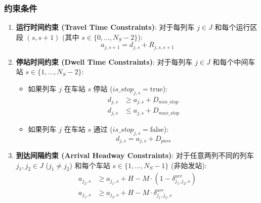 \documentclass{article}
\begin{document}
\subsubsection{约束条件}
\begin{enumerate}
    \item \textbf{运行时间约束 (Travel Time Constraints)}: 对于每列车 $j \in J$
        和每个运行区段 $(s, s+1)$ (其中 $s \in \{0, \dots, N_S-2\}$):
        \begin{equation}
            a_{j,s+1} = d_{j,s} + R_{j,s,s+1}\label{eq:travel_time}
        \end{equation}

    \item \textbf{停站时间约束 (Dwell Time Constraints)}: 对于每列车 $j \in J$
        和每个中间车站 $s \in \{1, \dots, N_S-2\}$:
        \begin{itemize}
            \item 如果列车 $j$ 在车站 $s$ 停站 ($is\_stop_{j,s} = \text{true}$):
                \begin{equation}
                    \begin{aligned}
                        d_{j,s} &\ge a_{j,s} + D_{min\_stop} \\
                        d_{j,s} &\le a_{j,s} + D_{max\_stop}
                    \end{aligned}\label{eq:dwell_time}
                \end{equation}
            \item 如果列车 $j$ 在车站 $s$ 通过 ($is\_stop_{j,s} = \text{false}$):
                \begin{equation}
                    d_{j,s} = a_{j,s} + D_{pass}\label{eq:dwell_time2}
                \end{equation}
        \end{itemize}

    \item \textbf{到达间隔约束 (Arrival Headway Constraints)}: 对于任意两列不同的列车
        $j_1, j_2 \in J$ ($j_1 \neq j_2$) 和每个车站 $s \in \{1, \dots,
        N_S-1\}$ (非始发站):
        \begin{equation}
            \begin{aligned}
                a_{j_2,s} &\ge a_{j_1,s} + H - M \cdot (1 -
                \delta^{arr}_{j_1,j_2,s}) \\
                a_{j_1,s} &\ge a_{j_2,s} + H - M \cdot \delta^{arr}_{j_1,j_2,s}
            \end{aligned}\label{eq:arrival_headway}
        \end{equation}


\end{enumerate}
\end{document}
